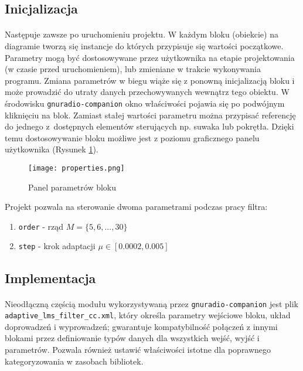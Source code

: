 \subsection{Inicjalizacja}
\paragraph{}
Następuje zawsze po uruchomieniu projektu. 
W każdym bloku (obiekcie) na diagramie tworzą się instancje do których przypisuje się wartości początkowe.
Parametry mogą być dostosowywane przez użytkownika na etapie projektowania (w czasie przed uruchomieniem), lub zmieniane w trakcie wykonywania programu.
Zmiana parametrów w biegu wiąże się z ponowną inicjalizacją bloku i może prowadzić do utraty danych przechowywanych wewnątrz tego obiektu. 
W środowisku \texttt{gnuradio-companion} okno właściwości pojawia się po podwójnym kliknięciu na blok. 
Zamiast stałej wartości parametru można przypisać referencję do jednego z~dostępnych elementów sterujących np. suwaka lub pokrętła. 
Dzięki temu dostosowywanie bloku możliwe jest z poziomu graficznego panelu użytkownika (Rysunek \ref{blockproperties}).

\begin{figure}[t]
\centering
\texttt{[image: properties.png]}
\caption{Panel parametrów bloku}
\label{blockproperties}
\end{figure}

Projekt pozwala na sterowanie dwoma parametrami podczas pracy filtra:
\begin{enumerate}
\item \texttt{order} - rząd $M = \{5,6,...,30\}$
\item \texttt{step} - krok adaptacji $\mu \in [0.0002, 0.005]$
\end{enumerate}

\subsection{Implementacja}
\paragraph{}
Nieodłączną częścią modułu wykorzystywaną przez \texttt{gnuradio-companion} jest plik \texttt{adaptive\_lms\_filter\_cc.xml}, który określa parametry wejściowe bloku, układ doprowadzeń i wyprowadzeń; gwarantuje kompatybilność połączeń z innymi blokami przez definiowanie typów danych dla wszystkich wejść, wyjść i parametrów. 
Pozwala również ustawić właściwości istotne dla poprawnego kategoryzowania w zasobach bibliotek.

